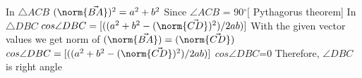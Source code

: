 In $\triangle ACB$  $(\norm{\vec{BA}})^2= a^2+b^2$
Since $\angle ACB$ = 90$^{\circ}$[ Pythagorus theorem]
\newline
In $\triangle DBC$ 
$cos \angle DBC= [((a^2+b^2-(\norm{\vec{CD}})^2)/2ab)] $
With the given vector values we get norm of $(\norm{\vec{BA}})=(\norm{\vec{CD}})$
\newline
$cos\angle DBC =[((a^2+b^2-(\norm{\vec{CD}})^2)/2ab)]$
$cos\angle DBC$=0
\newline
Therefore, $\angle DBC$ is right angle

